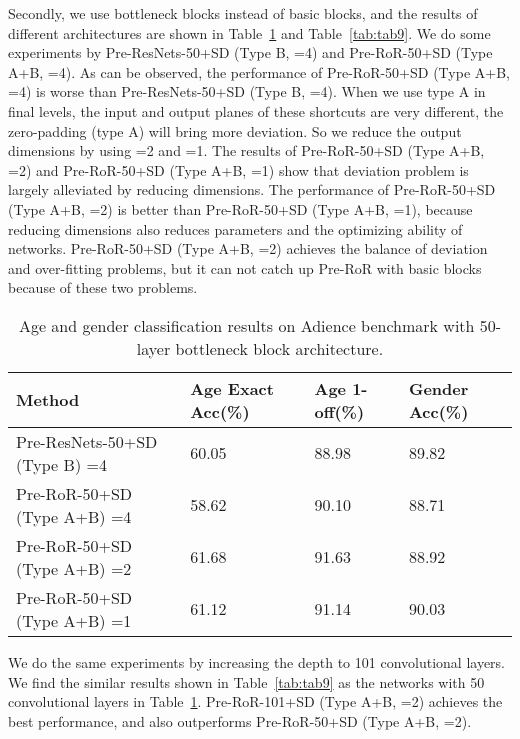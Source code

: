 \documentclass[journal]{IEEEtran}
\begin{document}
Secondly, we use bottleneck blocks instead of basic blocks, and the results of different architectures are shown in Table~\ref{tab:tab8} and Table~\ref{tab:tab9}. We do some experiments by Pre-ResNets-50+SD (Type B, =4) and Pre-RoR-50+SD (Type A+B, =4). As can be observed, the performance of Pre-RoR-50+SD (Type A+B, =4) is worse than Pre-ResNets-50+SD (Type B, =4). When we use type A in final levels, the input and output planes of these shortcuts are very different, the zero-padding (type A) will bring more deviation. So we reduce the output dimensions by using =2 and =1.  The results of Pre-RoR-50+SD (Type A+B, =2) and Pre-RoR-50+SD (Type A+B, =1) show that deviation problem is largely alleviated by reducing dimensions. The performance of Pre-RoR-50+SD (Type A+B, =2) is better than Pre-RoR-50+SD (Type A+B, =1), because reducing dimensions also reduces parameters and the optimizing ability of networks. Pre-RoR-50+SD (Type A+B, =2) achieves the balance of deviation and over-fitting problems, but it can not catch up Pre-RoR with basic blocks because of these two problems.

\begin{table}[h]
\caption{Age and gender classification results on Adience benchmark with 50-layer bottleneck block architecture.}
\centering
\begin{tabular}{|p{2.9cm}|p{1.5cm}|p{1.1cm}|p{1.3cm}|}
\hline
Method  &Age Exact Acc(\%)  &Age 1-off(\%) &Gender Acc(\%)   \\ 
\hline\hline
Pre-ResNets-50+SD (Type B) =4      &60.05  &88.98  &89.82  \\
\hline
Pre-RoR-50+SD  (Type A+B)  =4    &58.62  &90.10  &88.71  \\
\hline
Pre-RoR-50+SD  (Type A+B)  =2    &61.68  &91.63  &88.92  \\
\hline
Pre-RoR-50+SD  (Type A+B)  =1    &61.12  &91.14  &90.03  \\
\hline
\end{tabular}

\label{tab:tab8}
\end{table}

We do the same experiments by increasing the depth to 101 convolutional layers. We find the similar results shown in Table~\ref{tab:tab9} as the networks with 50 convolutional layers in Table~\ref{tab:tab8}. Pre-RoR-101+SD (Type A+B, =2) achieves the best performance, and also outperforms Pre-RoR-50+SD (Type A+B, =2).
\end{document}
